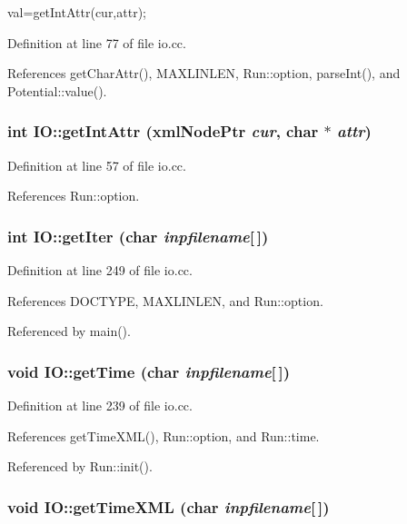 val=getIntAttr(cur,attr); 

Definition at line 77 of file io.cc.

References getCharAttr(), MAXLINLEN, Run::option, parseInt(), and Potential::value().\hypertarget{namespaceIO_b5b9ada82ed259c520bb673e1c4258dc}{
\subsubsection[{getIntAttr}]{\setlength{\rightskip}{0pt plus 5cm}int IO::getIntAttr (xmlNodePtr {\em cur}, \/  char $\ast$ {\em attr})}}
\label{namespaceIO_b5b9ada82ed259c520bb673e1c4258dc}




Definition at line 57 of file io.cc.

References Run::option.\hypertarget{namespaceIO_515d0f0fecb2223a56797e610ab7fd55}{
\subsubsection[{getIter}]{\setlength{\rightskip}{0pt plus 5cm}int IO::getIter (char {\em inpfilename}\mbox{[}$\,$\mbox{]})}}
\label{namespaceIO_515d0f0fecb2223a56797e610ab7fd55}




Definition at line 249 of file io.cc.

References DOCTYPE, MAXLINLEN, and Run::option.

Referenced by main().\hypertarget{namespaceIO_c2c6e9ae8fe7b5879dcf6383cb132f78}{
\subsubsection[{getTime}]{\setlength{\rightskip}{0pt plus 5cm}void IO::getTime (char {\em inpfilename}\mbox{[}$\,$\mbox{]})}}
\label{namespaceIO_c2c6e9ae8fe7b5879dcf6383cb132f78}




Definition at line 239 of file io.cc.

References getTimeXML(), Run::option, and Run::time.

Referenced by Run::init().\hypertarget{namespaceIO_d86f2db07db8938db8a574e4e7392cad}{
\subsubsection[{getTimeXML}]{\setlength{\rightskip}{0pt plus 5cm}void IO::getTimeXML (char {\em inpfilename}\mbox{[}$\,$\mbox{]})}}
\label{namespaceIO_d86f2db07db8938db8a574e4e7392cad}




